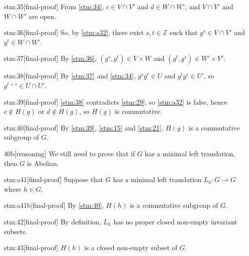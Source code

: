 \begin{stm}{stm:35}[final-proof]
From \ref{stm:34}, $c \in V \cap V'$ and $d \in W \cap W'$, and $V \cap V'$ and $W \cap W'$ are open.
\end{stm}

\begin{stm}{stm:36}[final-proof]
So, by \ref{stm:a32}, there exist $s,t \in \mathbb{Z}$ such that $g^s \in V \cap V'$ and $g^t \in W \cap W'$.
\end{stm}

\begin{stm}{stm:37}[final-proof]
By \ref{stm:36}, $(g^s, g^t) \in V \times W$ and $(g^t, g^s) \in W' \times V'$.
\end{stm}

\begin{stm}{stm:38}[final-proof]
By \ref{stm:37} and \ref{stm:34}, $g^s g^t \in U$ and $g^t g^s \in U'$, so $g^{t+s} \in U \cap U'$.
\end{stm}

\begin{stm}{stm:39}[final-proof]
\ref{stm:38} contradicts \ref{stm:29}, so \ref{stm:a32} is false, hence $c \notin H(g)$ or $d \notin H(g)$, so $H(g)$ is commutative.
\end{stm}

\begin{stm}{stm:40}[final-proof]
By \ref{stm:39}, \ref{stm:15} and \ref{stm:21}, $H(g)$ is a commutative subgroup of $G$.
\end{stm}

\begin{stm}{40b}[reasoning]
We still need to prove that if $G$ has a minimal left translation, then $G$ is Abelian.
\end{stm}

\begin{stm}{stm:a41}[final-proof]
Suppose that $G$ has a minimal left translation $L_h : G \to G$ where $h \in G$.
\end{stm}

\begin{stm}{stm:a41b}[final-proof]
By \ref{stm:40}, $H(h)$ is a commutative subgroup of $G$.
\end{stm}

\begin{stm}{stm:42}[final-proof]
By definition, $L_h$ has no proper closed non-empty invariant subsets.
\end{stm}

\begin{stm}{stm:43}[final-proof]
$H(h)$ is a closed non-empty subset of $G$.
\end{stm}

